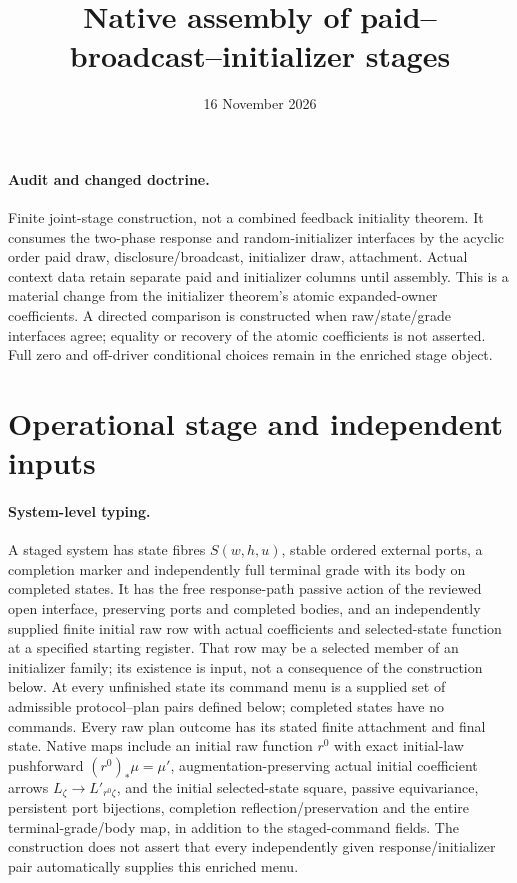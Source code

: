 \documentclass[11pt]{article}
\title{Native assembly of paid--broadcast--initializer stages}
\date{16 November 2026}
\begin{document}
\maketitle
\paragraph{Audit and changed doctrine.}
Finite joint-stage construction, not a combined feedback initiality theorem. It consumes the two-phase response and random-initializer interfaces by the acyclic order paid draw, disclosure/broadcast, initializer draw, attachment. Actual context data retain separate paid and initializer columns until assembly. This is a material change from the initializer theorem's atomic expanded-owner coefficients. A directed comparison is constructed when raw/state/grade interfaces agree; equality or recovery of the atomic coefficients is not asserted. Full zero and off-driver conditional choices remain in the enriched stage object.

\section{Operational stage and independent inputs}
\paragraph{System-level typing.}
A staged system has state fibres $S(w,h,u)$, stable ordered external ports, a completion marker and independently full terminal grade with its body on completed states. It has the free response-path passive action of the reviewed open interface, preserving ports and completed bodies, and an independently supplied finite initial raw row with actual coefficients and selected-state function at a specified starting register. That row may be a selected member of an initializer family; its existence is input, not a consequence of the construction below. At every unfinished state its command menu is a supplied set of admissible protocol--plan pairs defined below; completed states have no commands. Every raw plan outcome has its stated finite attachment and final state. Native maps include an initial raw function $r^0$ with exact initial-law pushforward $(r^0)_*\mu=\mu'$, augmentation-preserving actual initial coefficient arrows $L_\zeta\to L'_{r^0\zeta}$, and the initial selected-state square, passive equivariance, persistent port bijections, completion reflection/preservation and the entire terminal-grade/body map, in addition to the staged-command fields. The construction does not assert that every independently given response/initializer pair automatically supplies this enriched menu.
\end{document}
